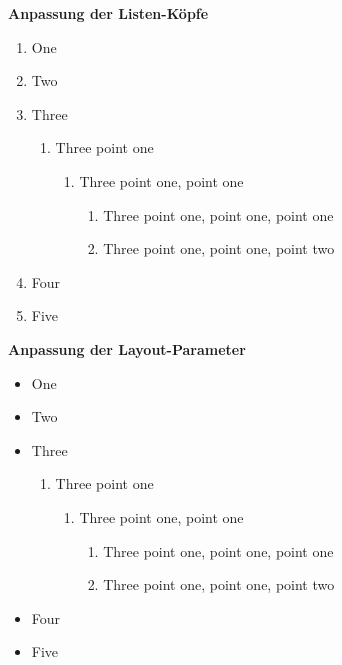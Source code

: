 \documentclass[a5paper]{article}
\begin{document}
\textbf{Anpassung der Listen-Köpfe}

\renewcommand{\labelenumii}{\arabic{enumi}.\arabic{enumii}}
\renewcommand{\labelenumiii}{\arabic{enumi}.\arabic{enumii}.\arabic{enumiii}}
\renewcommand{\labelenumiv}{\arabic{enumi}.\arabic{enumii}.\arabic{enumiii}.\arabic{enumiv}}

\begin{enumerate}
\item One
\item Two
\item Three
\begin{enumerate}
    \item Three point one
    \begin{enumerate}
    \item Three point one, point one
        \begin{enumerate}
        \item Three point one, point one, point one
        \item Three point one, point one, point two
        \end{enumerate}
    \end{enumerate}
\end{enumerate}
\item Four
\item Five
\end{enumerate}



\textbf{Anpassung der Layout-Parameter}



\begin{itemize}
\item One
\item Two
\item Three
\begin{enumerate}
    \item Three point one
    \begin{enumerate}
    \item Three point one, point one
        \begin{enumerate}
        \item Three point one, point one, point one
        \item Three point one, point one, point two
        \end{enumerate}
    \end{enumerate}
\end{enumerate}
\item Four
\item Five
\end{itemize}
\end{document}
